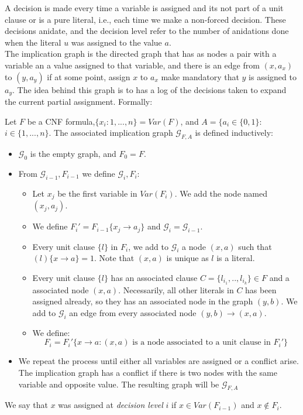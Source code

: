 A decision is made every time a variable is assigned and its not part of a unit clause or is a pure literal, i.e., each time we make a non-forced decision. These decisions anidate, and the decision level refer to the number of anidations done when the literal $u$ was assigned to the value $a$.\\

The implication graph  is the directed graph that has as nodes a pair with a variable an a value assigned to that variable, and there is an edge from $(x,a_x)$ to $(y,a_y)$ if at some point, assign $x$ to $a_x$  make mandatory that $y$ is assigned to $a_y$.  The idea behind this graph is to has a log of the decisions taken to expand the current partial assignment. Formally:


\begin{definition}
  Let $F$ be a CNF formula,$\{x_i : 1,...,n\} = Var(F)$, and $A=\{ a_i\in \{0,1\}:$ $ i\in \{1,...,n\}$. The associated implication graph $\mathcal{G}_{F,A}$ is defined inductively:
  \begin{itemize}
  \item $\mathcal{G}_0$ is the empty graph, and $F_0 = F$.
  \item From $\mathcal{G}_{i-1}, F_{i-1}$ we define $\mathcal{G}_{i},F_i$:
    \begin{itemize}
  \item Let $x_j$ be the first variable in $Var(F_i)$. We add the node named $(x_j,a_j)$.
  \item We define $F_i' = F_{i-1}\{x_j\to a_j\}$ and $\mathcal{G}_{i}=\mathcal{G}_{i-1}$.
  \item Every unit clause $\{l\}$ in $F_{i}$, we add to $\mathcal{G}_{i}$ a node $(x,a)$ such that $(l)\{x\to a\} = 1$. Note that $(x,a)$ is unique as $l$ is a literal.

  \item Every unit clause $\{l\}$ has an associated clause $C=\{l_{i_1},..,l_{i_k}\}\in F$ and a associated node $(x,a)$. Necessarily, all other literals in $C$ has been assigned already, so they has an associated node in the graph $(y,b)$. We add to $\mathcal{G}_{i}$ an edge from every associated node $(y,b)\to (x,a)$.
  \item We define:
    $$F_i = F_i'\{x\to a : (x,a) \text{ is a node associated to a unit clause in } F_i' \}$$
  \end{itemize}
  \item We repeat the process until either all variables are assigned or a conflict arise. The implication graph has a conflict if there is two nodes with the same variable and opposite value. The resulting graph will be $\mathcal{G}_{F,A}$
  \end{itemize}
  We say that $x$ was assigned at \emph{decision level} $i$ if $x\in Var(F_{i-1})$ and $x \not\in F_i$. 
 \end{definition} 


